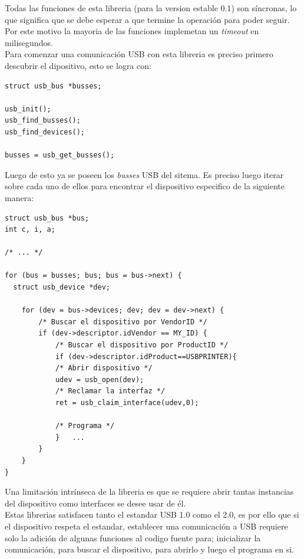 Todas las funciones de esta libreria (para la version estable 0.1) son
s\'incronas, lo que significa que se debe esperar a que termine la operaci\'on
para poder seguir. Por este motivo la mayoria de las funciones implemetan un
\emph{timeout} en milisegundos.\\



Para comenzar una comunicaci\'on USB con esta libreria es preciso primero
descubrir el dipositivo, esto se logra con:

\begin{footnotesize}
	\begin{verbatim}
struct usb_bus *busses;
    
usb_init();
usb_find_busses();
usb_find_devices();
    
busses = usb_get_busses();
	\end{verbatim}
\end{footnotesize}

Luego de esto ya se poseen los \emph{busses} USB del sitema. Es preciso luego
iterar sobre cada uno de ellos para encontrar el dispositivo especifico de la
siguiente manera:

\begin{footnotesize}
\begin{verbatim}
struct usb_bus *bus;
int c, i, a;
    
/* ... */
    
for (bus = busses; bus; bus = bus->next) {
  struct usb_device *dev;
    
    for (dev = bus->devices; dev; dev = dev->next) {
        /* Buscar el dispositivo por VendorID */
        if (dev->descriptor.idVendor == MY_ID) {
            /* Buscar el dispositivo por ProductID */
            if (dev->descriptor.idProduct==USBPRINTER){
            /* Abrir dispositivo */
            udev = usb_open(dev);
            /* Reclamar la interfaz */
            ret = usb_claim_interface(udev,0); 

            /* Programa */
            }	...
        }
    }
}
\end{verbatim}
\end{footnotesize}

Una limitaci\'on intr\'inseca de la libreria es que se requiere abrir tantas
instancias del dispositivo como interfaces se desee usar de \'el.\\

Estas librerias satisfacen tanto el estandar USB 1.0 como el 2.0, es por ello
que si el dispositivo respeta el estandar, establecer una comunicaci\'on a
USB requiere solo la adici\'on de algunas funciones al codigo fuente para;
inicializar la comunicaci\'on, para buscar el dispositivo, para abrirlo y
luego el programa en si.

